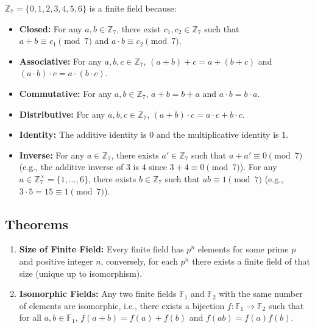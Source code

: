 $ $

\noindent $\mathbb{Z}_7 = \{0, 1, 2, 3, 4, 5, 6\}$ is a finite field because:
\begin{itemize}
\item \textbf{Closed:} For any $a,b \in \mathbb{Z}_7$, there exist $c_1,c_2 \in \mathbb{Z}_7$ such that $a+b \equiv c_1 \pmod{7}$ and $a\cdot b \equiv c_2 \pmod{7}$.
\item \textbf{Associative:} For any $a,b,c \in \mathbb{Z}_7$, $(a+b)+c=a+(b+c)$ and $(a\cdot b)\cdot c=a\cdot(b\cdot c)$.
\item \textbf{Commutative:} For any $a,b \in \mathbb{Z}_7$, $a+b=b+a$ and $a\cdot b=b\cdot a$.
\item \textbf{Distributive:} For any $a,b,c \in \mathbb{Z}_7$, $(a+b)\cdot c=a\cdot c+b\cdot c$.
\item \textbf{Identity:} The additive identity is $0$ and the multiplicative identity is $1$.
\item \textbf{Inverse:} For any $a \in \mathbb{Z}_7$, there exists $a' \in \mathbb{Z}_7$ such that $a+a' \equiv 0 \pmod{7}$ (e.g., the additive inverse of $3$ is $4$ since $3+4\equiv0 \pmod{7}$). For any $a \in \mathbb{Z}_7^\times=\{1,\dots,6\}$, there exists $b \in \mathbb{Z}_7$ such that $ab \equiv 1 \pmod{7}$ (e.g., $3\cdot5=15\equiv1 \pmod{7}$).
\end{itemize}

\subsection{Theorems}
\label{subsec:field-theorem}

\begin{tcolorbox}[title={\textbf{\tboxtheorem{\ref*{subsec:field-theorem}} Field Theorems}}]
\begin{enumerate}
\item \textbf{Size of Finite Field:} Every finite field has $p^n$ elements for some prime $p$ and positive integer $n$, conversely, for each $p^n$ there exists a finite field of that size (unique up to isomorphism).
\item \textbf{Isomorphic Fields:} Any two finite fields $\mathbb{F}_1$ and $\mathbb{F}_2$ with the same number of elements are isomorphic, i.e., there exists a bijection $f:\mathbb{F}_1\to\mathbb{F}_2$ such that for all $a,b\in\mathbb{F}_1$, $f(a+b)=f(a)+f(b)$ and $f(ab)=f(a)f(b)$.
\end{enumerate}
\end{tcolorbox}
